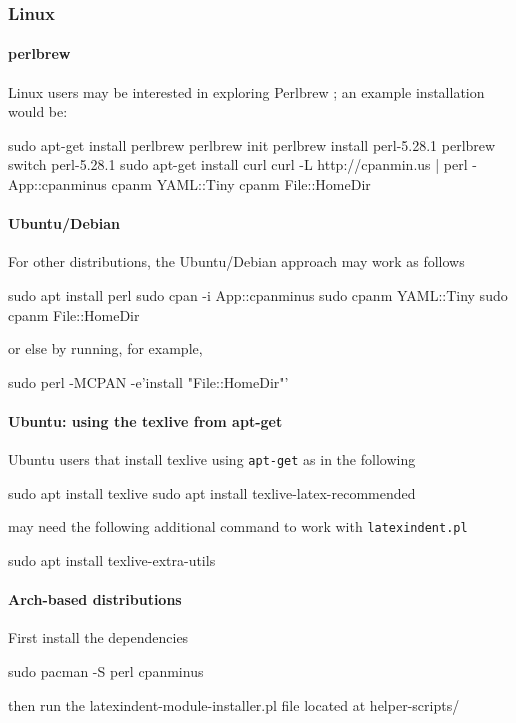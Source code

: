 	\subsubsection{Linux}
		\paragraph{perlbrew}
			Linux users may be interested in exploring Perlbrew \cite{perlbrew}; an example
			installation would be:
			\begin{commandshell}
sudo apt-get install perlbrew
perlbrew init
perlbrew install perl-5.28.1
perlbrew switch perl-5.28.1
sudo apt-get install curl
curl -L http://cpanmin.us | perl - App::cpanminus
cpanm YAML::Tiny
cpanm File::HomeDir
\end{commandshell}

		\paragraph{Ubuntu/Debian}
			For other distributions, the Ubuntu/Debian approach may work as follows
			\begin{commandshell}
sudo apt install perl
sudo cpan -i App::cpanminus
sudo cpanm YAML::Tiny
sudo cpanm File::HomeDir
\end{commandshell}
			or else by running, for example,
			\begin{commandshell}
sudo perl -MCPAN -e'install "File::HomeDir"'
\end{commandshell}

		\paragraph{Ubuntu: using the texlive from apt-get}
			Ubuntu users that install texlive using \texttt{apt-get} as in the following
			\begin{commandshell}
sudo apt install texlive
sudo apt install texlive-latex-recommended
\end{commandshell}
			may need the following additional command to work with \texttt{latexindent.pl}
			\begin{commandshell}
sudo apt install texlive-extra-utils 
\end{commandshell}
		\paragraph{Arch-based distributions}
			First install the dependencies
			\begin{commandshell}
sudo pacman -S perl cpanminus
\end{commandshell}
			then run the latexindent-module-installer.pl file located at helper-scripts/


